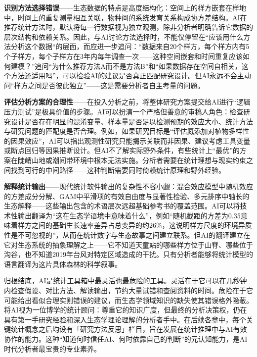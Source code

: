 \documentclass[
  twoside,12pt,fontset=none]{ctexbook}
\begin{document}
\textbf{识别方法选择错误}------生态数据的特点是高度结构化：空间上的样方嵌套在样地中，时间上的重复测量相互关联，物种间的系统发育关系构成协方差结构。AI在推荐统计方法时，默认将每一行数据视为独立观测，除非分析者明确告诉它数据的层次结构和依赖关系。因此，与AI讨论方法选择时，不能仅停留在``应该用什么方法分析这个数据``的层面，而应进一步追问：``数据来自20个样方，每个样方内有5个子样方，每个子样方在3年内每年调查一次------这种空间嵌套和时间重复应该如何建模？''追问``为什么推荐方法A而不是方法B''和``如果数据存在空间自相关，这个方法还适用吗''，可以检验AI的建议是否真正匹配研究设计。但AI永远不会主动问``样方之间是否彼此独立''------这是需要分析者自主考量的问题。

\textbf{评估分析方案的合理性}------在投入分析之前，将整体研究方案提交给AI进行``逻辑压力测试''是极具价值的步骤。AI可以扮演一个严格但善意的审稿人角色：检查研究设计是否存在明显的混淆变量、样本量是否足以检测预期的效应大小、统计方法与研究问题的匹配度是否合理。例如，如果研究目标是``评估氮添加对植物多样性的因果效应''，AI可以指出观测性研究只能揭示关联而非因果、建议考虑工具变量或断点回归等因果推断设计。但AI不了解实际野外条件，有些统计上``最优''的方案在陡峭山地或潮间带环境中根本无法实施。分析者需要在统计理想与现实约束之间找到可行的中间路径------这种判断需要同时倚赖统计原理和野外经验。

\textbf{解释统计输出}------现代统计软件输出的复杂性不容小觑：混合效应模型中随机效应的方差成分分解、GAM中平滑项的有效自由度与显著性检验、多元排序中轴长的生态解释------这些输出包含的术语层次远超基础参考书的覆盖范围。AI可以将技术性输出翻译为``这在生态学语境中意味着什么''，例如``随机截距的方差为0.35意味着样方之间的基础生长速率差异占总变异的约26\%，这说明样方尺度的环境异质性是不可忽视的''，从而在统计数字与生态故事之间建立联系。但AI的翻译建立在它对生态系统的抽象理解之上------它不知道天童站的哪些样方位于山脊、哪些位于沟谷，也不知道2019年台风对特定区域造成的干扰。只有分析者能够将统计模型的语言翻译为这片具体森林的科学叙事。

归根结底，AI是统计工具箱中最灵活也最危险的工具。灵活在于它可以在几秒钟内检查假设、对比方法、解读输出，节约大量试错和查阅资料的时间。危险在于它可能给出看似合理实则错误的建议，而生态学领域知识的缺失使其错误格外隐蔽。将AI视为一位博学的统计顾问：尊重它的知识广度，但最终的分析决策权，仍在具有第一手研究经验和深入生态学理论理解的分析者手中。在后续各章中，每个关键统计概念之后均设有「研究方法反思」栏目，旨在发展在统计推理中与AI有效协作的能力。这种``知道何时信任AI、何时依靠自己的判断''的元认知能力，是AI时代分析者最宝贵的专业素养。
\end{document}
